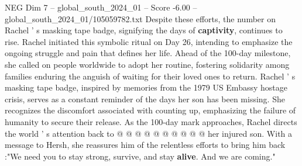 \begin{textsample}{NEG Dim 7 – global\_south\_2024\_01 – Score -6.00 – global\_south\_2024\_01/105059782.txt}
Despite these efforts, the number on Rachel ' s masking tape badge, signifying the days of \textbf{captivity}, continues to rise.
Rachel initiated this symbolic ritual on Day 26, intending to emphasize the ongoing struggle and pain that defines her life.
Ahead of the 100-day milestone, she called on people worldwide to adopt her routine, fostering solidarity among families enduring the anguish of waiting for their loved ones to return.
Rachel ' s masking tape badge, inspired by memories from the 1979 US Embassy hostage crisis, serves as a constant reminder of the days her son has been missing.
She recognizes the discomfort associated with counting up, emphasizing the failure of humanity to secure their release.
As the 100-day mark approaches, Rachel directs the world ' s attention back to @ @ @ @ @ @ @ @ @ @ her injured son.
With a message to Hersh, she reassures him of the relentless efforts to bring him back :"We need you to stay strong, survive, and stay \textbf{alive}.
And we are coming."

\end{textsample}
